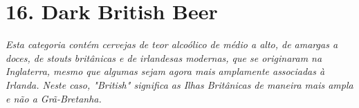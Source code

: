 \section*{16. Dark British Beer}
\textit{Esta categoria contém cervejas de teor alcoólico de médio a alto, de amargas a doces, de stouts britânicas e de irlandesas modernas, que se originaram na Inglaterra, mesmo que algumas sejam agora mais amplamente associadas à Irlanda. Neste caso, "British" significa as Ilhas Britânicas de maneira mais ampla e não a Grã-Bretanha.}
